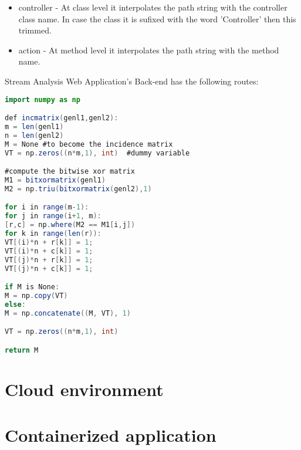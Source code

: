 \begin{itemize}
	\item controller - At class level it interpolates the path string with the controller class name. In case the class it is sufixed with the word 'Controller' then this trimmed.
	\item action - At method level it interpolates the path string with the method name.
\end{itemize}

Stream Analysis Web Application's Back-end has the following routes:

\begin{lstlisting}[language=Java]
import numpy as np

def incmatrix(genl1,genl2):
m = len(genl1)
n = len(genl2)
M = None #to become the incidence matrix
VT = np.zeros((n*m,1), int)  #dummy variable

#compute the bitwise xor matrix
M1 = bitxormatrix(genl1)
M2 = np.triu(bitxormatrix(genl2),1) 

for i in range(m-1):
for j in range(i+1, m):
[r,c] = np.where(M2 == M1[i,j])
for k in range(len(r)):
VT[(i)*n + r[k]] = 1;
VT[(i)*n + c[k]] = 1;
VT[(j)*n + r[k]] = 1;
VT[(j)*n + c[k]] = 1;

if M is None:
M = np.copy(VT)
else:
M = np.concatenate((M, VT), 1)

VT = np.zeros((n*m,1), int)

return M
\end{lstlisting}

\section{Cloud environment}
\label{chap:04:03}

\section{Containerized application}
\label{chap:04:04}